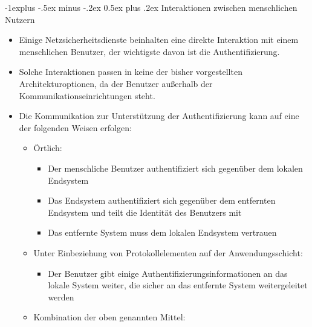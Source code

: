 \documentclass[a4paper]{article}
\makeatletter
\renewcommand{\subsection}{\@startsection{subsection}{2}{0mm}%
 {-1explus -.5ex minus -.2ex}%
 {0.5ex plus .2ex}%
 {\normalfont\normalsize\bfseries}}
\makeatother
\begin{document}
\begin{multicols}{3}
    \subsection{Interaktionen zwischen menschlichen
        Nutzern}

    \begin{itemize}
        \item
              Einige Netzsicherheitsdienste beinhalten eine direkte Interaktion mit
              einem menschlichen Benutzer, der wichtigste davon ist die
              Authentifizierung.
        \item
              Solche Interaktionen passen in keine der bisher vorgestellten
              Architekturoptionen, da der Benutzer außerhalb der
              Kommunikationseinrichtungen steht.
        \item
              Die Kommunikation zur Unterstützung der Authentifizierung kann auf
              eine der folgenden Weisen erfolgen:

              \begin{itemize}
                  \item
                        Örtlich:

                        \begin{itemize}
                            \item
                                  Der menschliche Benutzer authentifiziert sich gegenüber dem
                                  lokalen Endsystem
                            \item
                                  Das Endsystem authentifiziert sich gegenüber dem entfernten
                                  Endsystem und teilt die Identität des Benutzers mit
                            \item
                                  Das entfernte System muss dem lokalen Endsystem vertrauen
                        \end{itemize}
                  \item
                        Unter Einbeziehung von Protokollelementen auf der Anwendungsschicht:

                        \begin{itemize}
                            \item
                                  Der Benutzer gibt einige Authentifizierungsinformationen an das
                                  lokale System weiter, die sicher an das entfernte System
                                  weitergeleitet werden
                        \end{itemize}
                  \item
                        Kombination der oben genannten Mittel:


\end{itemize}
\end{itemize}
\end{multicols}
\end{document}
